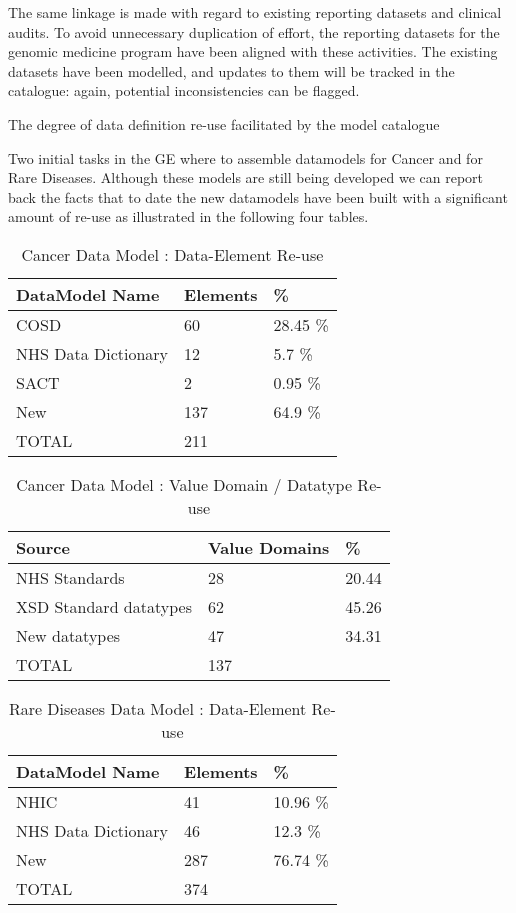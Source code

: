 The same linkage is made with regard to existing reporting datasets
and clinical audits.  To avoid unnecessary duplication of effort, the
reporting datasets for the genomic medicine program have been aligned
with these activities.  The existing datasets have been modelled, and
updates to them will be tracked in the catalogue: again, potential
inconsistencies can be flagged. 

The degree of data definition re-use facilitated by the model
catalogue 

Two initial tasks in the GE where to assemble datamodels for Cancer and for Rare Diseases. Although these models are still being developed we can report back the facts that to date the new datamodels have been built with a significant amount of re-use as illustrated in the following four tables.

\begin{table}[h]
	\caption{Cancer Data Model : Data-Element Re-use}
	\begin{tabular}{ p{2.8cm} p{1.8cm}  p{1.8cm}   }  %
		\hline
		DataModel Name &  Elements & \%  \\ 
		\hline
		COSD & 60 & 28.45 \% \\
		NHS Data Dictionary & 12 & 5.7 \% \\
		SACT & 2 & 0.95 \% \\
		New & 137 & 64.9 \% \\
		\hline
		TOTAL & 211
	\end{tabular}
\end{table}

\begin{table}[h]
		\caption{Cancer Data Model : Value Domain / Datatype Re-use}
	\begin{tabular}{p{2.8cm} p{1.8cm}  p{1.8cm}     }  %
		\hline
		Source & Value Domains& \%  \\ 
		\hline
		NHS Standards & 28 & 20.44\\
		XSD Standard datatypes & 62 & 45.26 \\
		New datatypes & 47 & 34.31 \\
		\hline
		TOTAL & 137
	\end{tabular}
\end{table}

\begin{table}[h]
	\caption{Rare Diseases Data Model : Data-Element Re-use}
	\begin{tabular}{ p{2.8cm} p{1.8cm}  p{1.8cm}   }  %
		\hline
		DataModel Name &  Elements & \%  \\ 
		\hline
		NHIC & 41 & 10.96 \% \\
		NHS Data Dictionary & 46 & 12.3 \% \\
		New & 287 & 76.74 \% \\
		\hline
		TOTAL & 374
	\end{tabular}
\end{table}

